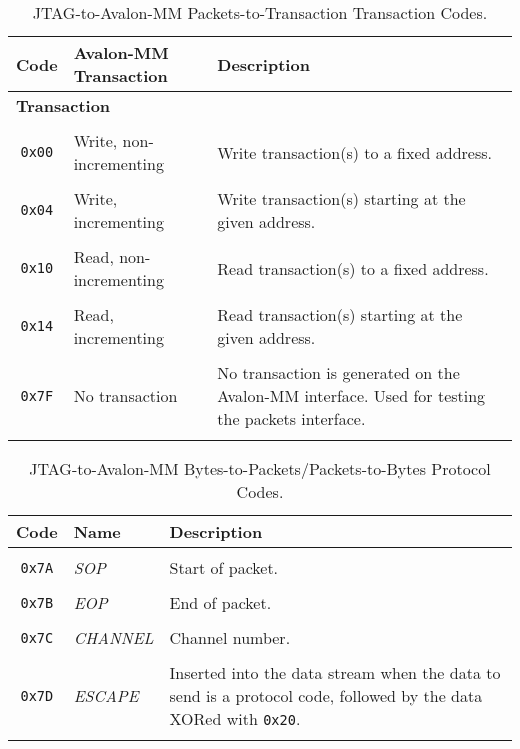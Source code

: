 \documentclass[10pt,twoside]{article}
\begin{document}
\clearpage
%
\begin{table}[p]
\caption{JTAG-to-Avalon-MM Packets-to-Transaction Transaction Codes.}
\label{tab:jtag_to_avalon_mm_transaction_codes}
\begin{center}
\begin{tabular}{|c|l|p{9cm}|}
\hline
Code & Avalon-MM Transaction & Description\\
\hline\hline
\multicolumn{3}{|l|}{\bf Transaction}\\
\hline
&&\\
\verb+0x00+ & Write, non-incrementing  & Write transaction(s) to a fixed address.\\
&&\\
\verb+0x04+ & Write, incrementing      & Write transaction(s) starting at the given address.\\
&&\\
\verb+0x10+ & Read, non-incrementing   & Read transaction(s) to a fixed address.\\
&&\\
\verb+0x14+ & Read, incrementing       & Read transaction(s) starting at the given address.\\
&&\\
\verb+0x7F+ & No transaction           & No transaction is generated on the Avalon-MM interface. Used for testing the packets interface.\\
&&\\
\hline
\end{tabular}
\end{center}
\end{table}

%
\begin{table}[p]
\caption{JTAG-to-Avalon-MM Bytes-to-Packets/Packets-to-Bytes Protocol Codes.}
\label{tab:jtag_to_avalon_mm_protocol_codes}
\begin{center}
\begin{tabular}{|c|l|p{10cm}|}
\hline
Code & Name & Description\\
\hline\hline
&&\\
\verb+0x7A+ & {\em SOP}     & Start of packet.\\
&&\\
\verb+0x7B+ & {\em EOP}     & End of packet.\\
&&\\
\verb+0x7C+ & {\em CHANNEL} & Channel number.\\
&&\\
\verb+0x7D+ & {\em ESCAPE}  & Inserted into the data stream when the
                              data to send is a protocol code, followed
                              by the data XORed with \verb+0x20+.\\
&&\\
\hline
\end{tabular}
\end{center}
\end{table}
\end{document}
